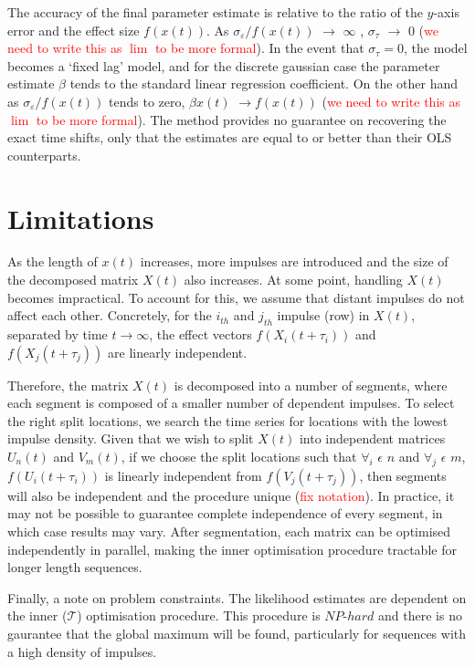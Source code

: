 \documentclass[11pt]{amsart}
\begin{document}
The accuracy of the final parameter estimate is relative to the ratio of the $y$-axis error and the effect size $f(x(t))$. As $\sigma_{\varepsilon}/f(x(t))$ $\rightarrow$ $\infty$ , $\sigma_{\tau}$ $\rightarrow$ $0$ (\textcolor{red}{we need to write this as $\lim$ to be more formal}). In the event that $\sigma_{\tau}=0$, the model becomes a ‘fixed lag’ model, and for the discrete gaussian case the parameter estimate $\beta$ tends to the standard linear regression coefficient.
On the other hand as $\sigma_{\varepsilon}/f(x(t))$ tends to zero, $\beta x(t)$ $\rightarrow f(x(t))$ (\textcolor{red}{we need to write this as $\lim$ to be more formal}). The method provides no guarantee on recovering the exact time shifts, only that the estimates are equal to or better than their OLS counterparts.

\section{Limitations}
As the length of $x(t)$ increases, more impulses are introduced and the size of the decomposed matrix $X(t)$ also increases. At some point, handling $X(t)$ becomes impractical. To account for this, we assume that distant impulses do not affect each other. Concretely, for the $i_{th}$ and $j_{th}$ impulse (row) in $X(t)$, separated by time $t \longrightarrow \infty$, the effect vectors $f(X_i(t + \tau_i))$ and $f(X_j(t + \tau_j))$ are linearly independent.

Therefore, the matrix $X(t)$ is decomposed into a number of segments, where each segment is 
composed of a smaller number of dependent impulses. To select the right split locations, we search the time series for locations with the lowest impulse density. Given that we wish to split $X(t)$ into independent matrices $U_n(t)$ and $V_m(t)$, 
if we choose the split locations such that $\forall_i$ $\epsilon$ $n$ and  $\forall_j$ $\epsilon$ $m$, 
$f(U_i(t + \tau_i))$ is linearly independent from $f(V_j(t + \tau_j))$, 
then segments will also be independent and the procedure unique (\textcolor{red}{fix notation}). 
In practice, it may not be possible to guarantee complete independence of every segment, 
in which case results may vary. After segmentation, each matrix can be optimised independently 
in parallel, making the inner optimisation procedure tractable for longer length sequences. 

Finally, a note on problem constraints. The likelihood estimates are dependent on the inner ($\mathcal{T}$) optimisation procedure. This procedure is $NP$-$hard$ and there is no gaurantee that the global maximum will be found, particularly for sequences with a high density of impulses. 
\end{document}
